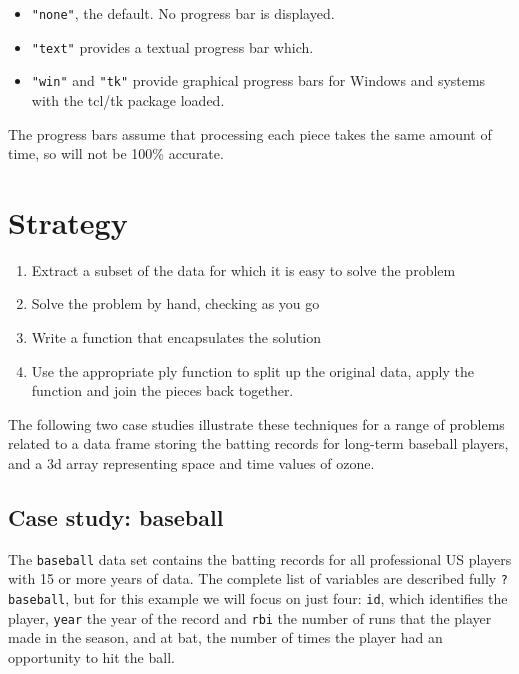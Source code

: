 \documentclass{scrartcl}
\begin{document}
\begin{itemize}
  \item {\tt "none"}, the default.  No progress bar is displayed.
  \item {\tt "text"} provides a textual progress bar which.
  \item {\tt "win"} and {\tt "tk"} provide graphical progress bars for Windows and systems with the tcl/tk package loaded.
\end{itemize}

The progress bars assume that processing each piece takes the same amount of time, so will not be 100\% accurate.

\section{Strategy}
\label{sec:strategy}



\begin{enumerate}
  \item Extract a subset of the data for which it is easy to solve the problem
  \item Solve the problem by hand, checking as you go
  \item Write a function that encapsulates the solution
  \item Use the appropriate ply function to split up the original data, apply the function and join the pieces back together.
  
\end{enumerate}

The following two case studies illustrate these techniques for a range of problems related to a data frame storing the batting records for long-term baseball players, and a 3d array representing space and time values of ozone.

\subsection{Case study: baseball}

The {\tt baseball} data set contains the batting records for all professional US players with 15 or more years of data.  The complete list of variables are described fully {\tt ?baseball}, but for this example we will focus on just four: {\tt id}, which identifies the player, {\tt year} the year of the record and {\tt rbi} the number of runs that the player made in the season, and {\tt} at bat, the number of times the player had an opportunity to hit the ball.
\end{document}
